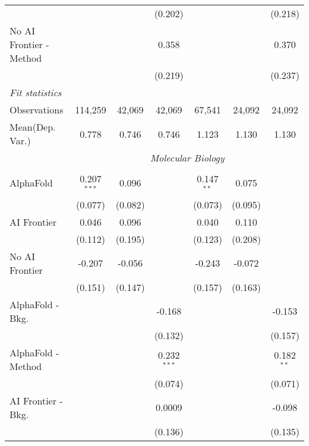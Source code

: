 \begin{tabular}{lcccccc}
                           &         &         & (0.202) &         &         & (0.218)\\   
   No AI Frontier - Method &         &         & 0.358   &         &         & 0.370\\   
                           &         &         & (0.219) &         &         & (0.237)\\   
   \midrule
   \emph{Fit statistics}\\
   Observations            & 114,259 & 42,069  & 42,069  & 67,541  & 24,092  & 24,092\\  
Mean(Dep. Var.) & 0.778 & 0.746 & 0.746 & 1.123 & 1.130 & 1.130 \\
   
 & \multicolumn{6}{c}{\textit{Molecular Biology}} \\ \\
   AlphaFold               & 0.207$^{***}$ & 0.096   &               & 0.147$^{**}$ & 0.075   &   \\   
                           & (0.077)       & (0.082) &               & (0.073)      & (0.095) &   \\   
   AI Frontier             & 0.046         & 0.096   &               & 0.040        & 0.110   &   \\   
                           & (0.112)       & (0.195) &               & (0.123)      & (0.208) &   \\   
   No AI Frontier          & -0.207        & -0.056  &               & -0.243       & -0.072  &   \\   
                           & (0.151)       & (0.147) &               & (0.157)      & (0.163) &   \\   
   AlphaFold - Bkg.        &               &         & -0.168        &              &         & -0.153\\   
                           &               &         & (0.132)       &              &         & (0.157)\\   
   AlphaFold - Method      &               &         & 0.232$^{***}$ &              &         & 0.182$^{**}$\\   
                           &               &         & (0.074)       &              &         & (0.071)\\   
   AI Frontier - Bkg.      &               &         & 0.0009        &              &         & -0.098\\   
                           &               &         & (0.136)       &              &         & (0.135)\\   

\end{tabular}
